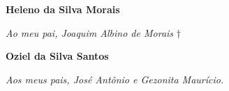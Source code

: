 \begin{dedicatoria}
   \textbf{Heleno da Silva Morais}
   \vspace*{\fill}
   \begin{flushright}
   	\textit{Ao meu pai, Joaquim Albino de Morais} $\dagger$\\
   \end{flushright}
	\noindent
	\vspace*{\fill}
	
	\pagebreak

   \textbf{Oziel da Silva Santos}
   
   \vspace*{\fill}
   \begin{flushright}
   	\textit{Aos meus pais, José Antônio e Gezonita Maurício.}
   \end{flushright}
 \vspace*{\fill}
   
\end{dedicatoria}
